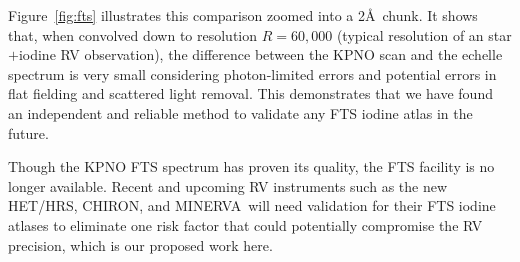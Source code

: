 \documentclass[12pt]{article}
\def\minerva{MINERVA}
\def\hrs{HET/HRS}
\begin{document}
Figure~\ref{fig:fts} illustrates this comparison zoomed into a 2\AA\
chunk. It shows that, when convolved down to resolution $R=60,000$
(typical resolution of an star$+$iodine RV observation), the
difference between the KPNO scan and the echelle spectrum is very
small considering photon-limited errors and potential errors in flat
fielding and scattered light removal. This demonstrates that we have
found an independent and reliable method to validate any FTS iodine
atlas in the future.

Though the KPNO FTS spectrum has proven its quality, the FTS facility
is no longer available. Recent and upcoming RV instruments such as the
new \hrs, CHIRON, and \minerva\ will need validation for their FTS
iodine atlases to eliminate one risk factor that could potentially
compromise the RV precision, which is our proposed work here.

\end{document}
